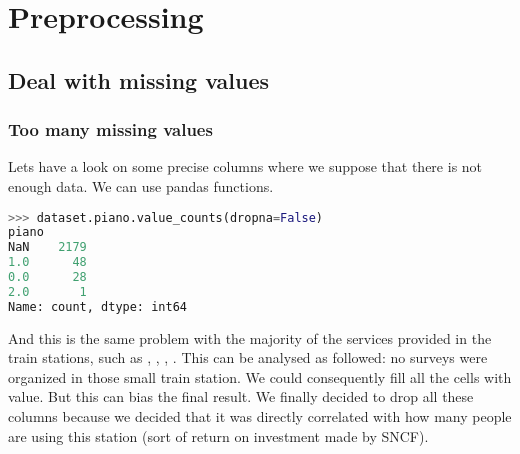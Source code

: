 \chapter{Preprocessing}

\section{Deal with missing values}
\subsection{Too many missing values}
Lets have a look on some precise columns where we suppose that there is not enough data. We can use pandas functions.
\begin{lstlisting}[language=python]
>>> dataset.piano.value_counts(dropna=False)
piano
NaN    2179
1.0      48
0.0      28
2.0       1
Name: count, dtype: int64
\end{lstlisting}
And this is the same problem with the majority of the services provided in the train stations, such as , , , . This can be analysed as followed: no surveys were organized in those small train station. We could consequently fill all the cells with  value. But this can bias the final result. We finally decided to drop all these columns because we decided that it was directly correlated with how many people are using this station (sort of return on investment made by SNCF).

